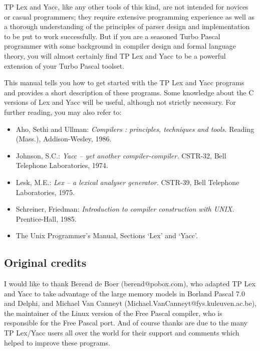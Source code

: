 \documentclass{article}
\begin{document}
TP Lex and Yacc, like any other tools of this kind, are not intended for
novices or casual programmers; they require extensive programming experience
as well as a thorough understanding of the principles of parser design and
implementation to be put to work successfully. But if you are a seasoned
Turbo Pascal programmer with some background in compiler design and formal
language theory, you will almost certainly find TP Lex and Yacc to be a
powerful extension of your Turbo Pascal toolset.

This manual tells you how to get started with the TP Lex and Yacc programs
and provides a short description of these programs. Some knowledge about
the C versions of Lex and Yacc will be useful, although not strictly
necessary. For further reading, you may also refer to:

\begin{itemize}
   \item
      Aho, Sethi and Ullman: {\em Compilers : principles, techniques and
      tools.\/} Reading (Mass.), Addison-Wesley, 1986.
   \item
      Johnson, S.C.: {\em Yacc -- yet another compiler-compiler.\/} CSTR-32,
      Bell Telephone Laboratories, 1974.
   \item
      Lesk, M.E.: {\em Lex -- a lexical analyser generator.\/} CSTR-39, Bell
      Telephone Laboratories, 1975.
   \item
      Schreiner, Friedman: {\em Introduction to compiler construction with
      UNIX.\/} Prentice-Hall, 1985.
   \item
      The Unix Programmer's Manual, Sections `Lex' and `Yacc'.
\end{itemize}

\subsection{Original credits}

I would like to thank Berend de Boer (berend@pobox.com), who adapted TP Lex
and Yacc to take advantage of the large memory models in Borland Pascal 7.0
and Delphi, and Michael Van Canneyt (Michael.VanCanneyt@fys.kuleuven.ac.be),
the maintainer of the Linux version of the Free Pascal compiler, who is
responsible for the Free Pascal port. And of course thanks are due to the many
TP Lex/Yacc users all over the world for their support and comments which
helped to improve these programs.
\end{document}
